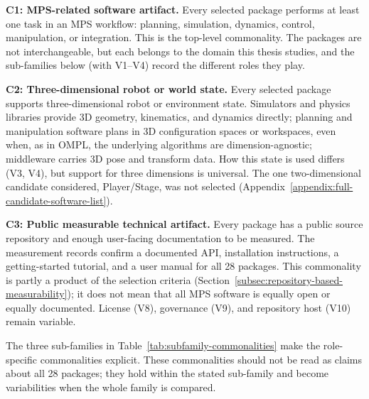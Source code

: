 \textbf{C1: MPS-related software artifact.} Every selected package performs at least one task in an MPS workflow: planning, simulation, dynamics, control, manipulation, or integration. This is the top-level commonality. The packages are not interchangeable, but each belongs to the domain this thesis studies, and the sub-families below (with V1--V4) record the different roles they play.

\textbf{C2: Three-dimensional robot or world state.} Every selected package supports three-dimensional robot or environment state. Simulators and physics libraries provide 3D geometry, kinematics, and dynamics directly; planning and manipulation software plans in 3D configuration spaces or workspaces, even when, as in OMPL, the underlying algorithms are dimension-agnostic; middleware carries 3D pose and transform data. How this state is used differs (V3, V4), but support for three dimensions is universal. The one two-dimensional candidate considered, Player/Stage, was not selected (Appendix~\ref{appendix:full-candidate-software-list}).

\textbf{C3: Public measurable technical artifact.} Every package has a public source repository and enough user-facing documentation to be measured. The measurement records confirm a documented API, installation instructions, a getting-started tutorial, and a user manual for all 28 packages. This commonality is partly a product of the selection criteria (Section~\ref{subsec:repository-based-measurability}); it does not mean that all MPS software is equally open or equally documented. License (V8), governance (V9), and repository host (V10) remain variable.

The three sub-families in Table~\ref{tab:subfamily-commonalities} make the role-specific commonalities explicit. These commonalities should not be read as claims about all 28 packages; they hold within the stated sub-family and become variabilities when the whole family is compared.

